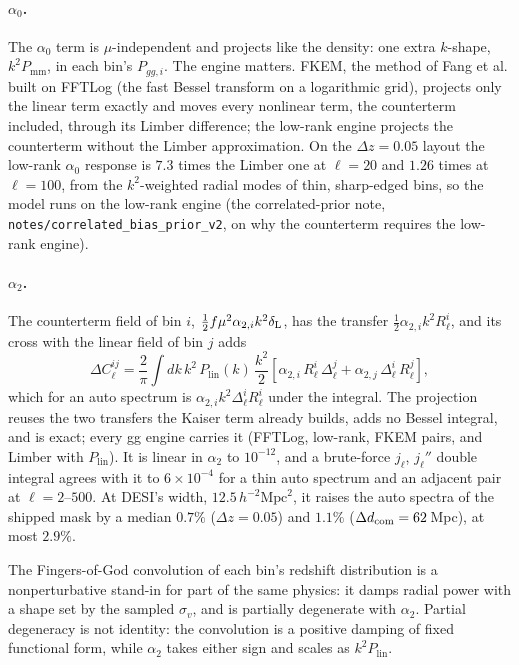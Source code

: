 \documentclass[11pt]{article}
\newcommand{\plin}{P_{\mathrm{lin}}}
\newcommand{\pnl}{P_{\mathrm{mm}}}
\newcommand{\aunit}{\,h^{-2}\mathrm{Mpc}^2}
\begin{document}
\paragraph{$\alpha_0$.}  The $\alpha_0$ term is $\mu$-independent and
projects like the density: one extra $k$-shape, $k^2\pnl$, in each
bin's $P_{gg,i}$.  The engine matters.  FKEM, the method of
Fang et al. \cite{FangKEM2020} built on FFTLog (the fast Bessel
transform on a logarithmic grid), projects only the linear term exactly
and moves every nonlinear term, the counterterm included, through its
Limber difference; the low-rank engine projects the
counterterm without the Limber approximation.  On the $\Delta z = 0.05$
layout the low-rank $\alpha_0$ response is $7.3$ times the Limber one
at $\ell = 20$ and $1.26$ times at $\ell = 100$, from the $k^2$-weighted
radial modes of thin, sharp-edged bins, so the model runs on the
low-rank engine (the correlated-prior note,
\texttt{notes/correlated\_bias\_prior\_v2}, on why the counterterm
requires the low-rank engine).

\paragraph{$\alpha_2$.}  The counterterm field of bin $i$,
$\tfrac12 f\mu^2\alpha_{2,i} k^2\delta_{\rm L}$, has the transfer
$\tfrac12\alpha_{2,i}k^2 R_\ell^i$, and its cross with the linear field
of bin $j$ adds
\begin{equation}
\Delta C_\ell^{ij} = \frac{2}{\pi}\int dk\,k^2\,\plin(k)\,
 \frac{k^2}{2}\left[\alpha_{2,i}\,R_\ell^i\,\Delta_\ell^j
 + \alpha_{2,j}\,\Delta_\ell^i\,R_\ell^j\right] ,
\label{eq:alpha2-proj}
\end{equation}
which for an auto spectrum is $\alpha_{2,i}k^2\Delta_\ell^i R_\ell^i$
under the integral.  The projection reuses the two transfers the
Kaiser term already builds, adds no Bessel integral, and is exact;
every gg engine carries it (FFTLog, low-rank, FKEM pairs, and Limber
with $\plin$).  It is linear in $\alpha_2$ to $10^{-12}$, and a
brute-force $j_\ell$, $j_\ell''$ double integral agrees with it to
$6\times10^{-4}$ for a thin auto spectrum and an adjacent pair at
$\ell = 2$--$500$.  At DESI's width, $12.5\aunit$, it raises the auto
spectra of the shipped mask by a median $0.7\%$ ($\Delta z = 0.05$)
and $1.1\%$ ($\Delta d_{\rm com} = 62$\,Mpc), at most $2.9\%$.

The Fingers-of-God convolution of each bin's redshift distribution is a
nonperturbative stand-in for part of the same physics: it damps radial
power with a shape set by the sampled $\sigma_v$, and is partially
degenerate with $\alpha_2$.  Partial degeneracy is not identity: the
convolution is a positive damping of fixed functional form, while
$\alpha_2$ takes either sign and scales as $k^2\plin$.
\end{document}
